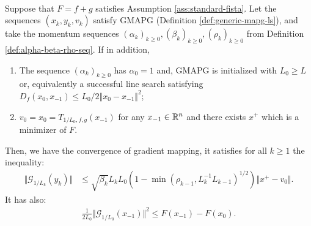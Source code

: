 \documentclass[12pt]{report}
\begin{document}
        \begin{theorem}\;\label{thm:gmapg-generic-gm-cnvg}\\
            Suppose that $F = f + g$ satisfies Assumption \ref{ass:standard-fista}. 
            Let the sequences $(x_k, y_k, v_k)$ satisfy GMAPG (Definition \ref{def:generic-mapg-ls}), and take the momentum sequences $(\alpha_k)_{k \ge 0}, (\beta_k)_{k \ge 0}, (\rho_k)_{k \ge 0}$ from Definition \ref{def:alpha-beta-rho-seq}. 
            If in addition, 
            \begin{enumerate}
                \item The sequence $(\alpha_k)_{k \ge 0}$ has $\alpha_0 = 1$ and, GMAPG is initialized with $L_0 \ge L$ or, equivalently a successful line search satisfying \mbox{$D_f(x_{0}, x_{-1}) \le L_0/2\Vert x_{0} - x_{-1}\Vert^2$};
                \item $v_0=x_0 = T_{1/L_0, f, g}(x_{-1})$ for any $x_{-1} \in\mathbb R^n$ and there exists $x^+$ which is a minimizer of $F$. 
            \end{enumerate}
            Then, we have the convergence of gradient mapping, it satisfies for all $k \ge 1$ the inequality:
            \begin{align}\label{ineq:gmapg-generic-gm-cnvg-prt1}
                \Vert \mathcal G_{1/L_k} (y_k)\Vert &\le 
                \sqrt{\beta_k}L_k L_0 \left(
                    1 - 
                    \min(\rho_{k - 1}, L_k^{-1} L_{k - 1})^{1/2}
                \right)\Vert x^+ - v_0\Vert. 
            \end{align}
            It has also:
            \begin{align}\label{ineq:gmapg-generic-gm-cnvg-prt2}
                \frac{1}{2L_0}\Vert \mathcal G_{1/L_0}(x_{-1}) \Vert^2
                \le F(x_{-1}) - F(x_0). 
            \end{align}
        \end{theorem}
\end{document}
